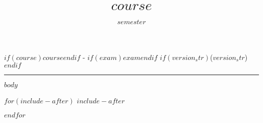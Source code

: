 \documentclass[12pt]{article}
\title{$course$}
\date{$semester$}
\begin{document}
\thispagestyle{firststyle}
\begin{center}
{\Large $if(course)$$course$$endif$ - $if(exam)$$exam$$endif$ $if(version_str)$($version_str$)$endif$}\\[.5cm]
\end{center}
\hrule
\vspace{.5cm}

$body$



$for(include-after)$
$include-after$

$endfor$
\end{document}
